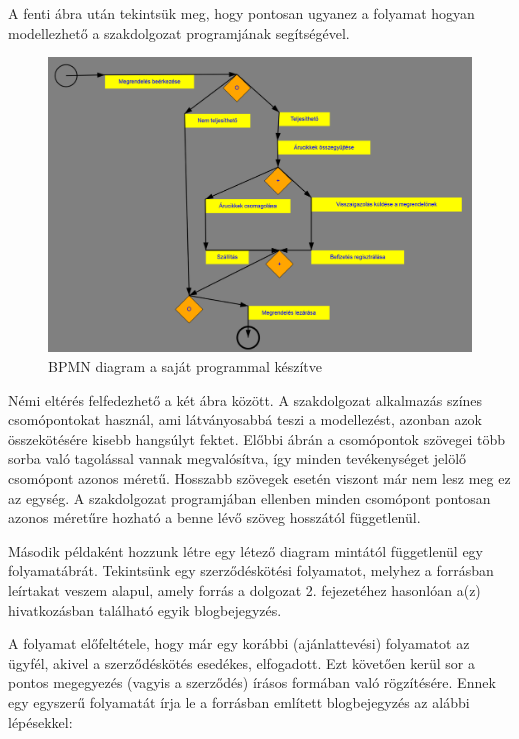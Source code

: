 A fenti ábra után tekintsük meg, hogy pontosan ugyanez a folyamat hogyan modellezhető a szakdolgozat programjának segítségével.

\begin{figure}[h]
\centering
\includegraphics[scale=0.45]{images/pelda1NEMVEGLEGES.png}
\caption{BPMN diagram a saját programmal készítve}
\label{fig:bpmn}
\end{figure}

Némi eltérés felfedezhető a két ábra között. A szakdolgozat alkalmazás színes csomópontokat használ, ami látványosabbá teszi a modellezést, azonban azok összekötésére kisebb hangsúlyt fektet. Előbbi ábrán a csomópontok szövegei több sorba való tagolással vannak megvalósítva, így minden tevékenységet jelölő csomópont azonos méretű. Hosszabb szövegek esetén viszont már nem lesz meg ez az egység. A szakdolgozat programjában ellenben minden csomópont pontosan azonos méretűre hozható a benne lévő szöveg hosszától függetlenül.


Második példaként hozzunk létre egy létező diagram mintától függetlenül egy folyamatábrát. Tekintsünk egy szerződéskötési folyamatot, melyhez a \cite{xflowutolso} forrásban leírtakat veszem alapul, amely forrás a dolgozat 2. fejezetéhez hasonlóan a(z) \cite{xflower} hivatkozásban található egyik blogbejegyzés.

A folyamat előfeltétele, hogy már egy korábbi (ajánlattevési) folyamatot az ügyfél, akivel a szerződéskötés esedékes, elfogadott. Ezt követően kerül sor a pontos megegyezés (vagyis a szerződés) írásos formában való rögzítésére. Ennek egy egyszerű folyamatát írja le a forrásban említett blogbejegyzés az alábbi lépésekkel:

